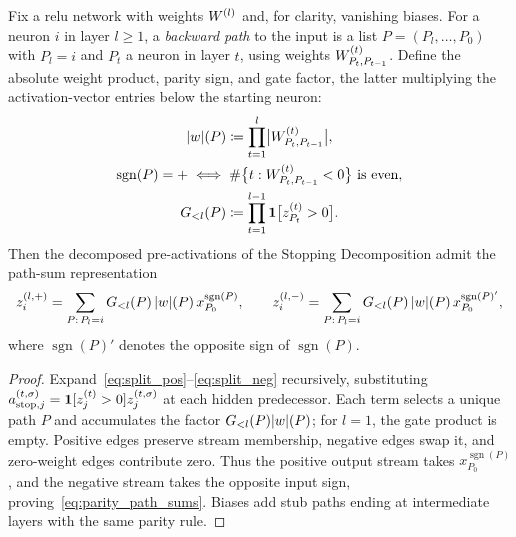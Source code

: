 \begin{lemmaenv}\label{lem:parity_path}
Fix a \ac{relu} network with weights $W^{(l)}$ and, for clarity, vanishing biases. For a neuron $i$ in layer $l \ge 1$, a \emph{backward path} to the input is a list $P = (P_l, \dots, P_0)$ with $P_l = i$ and $P_t$ a neuron in layer $t$, using weights $W^{(t)}_{P_t, P_{t-1}}$. Define the absolute weight product, parity sign, and gate factor, the latter multiplying the activation-vector entries below the starting neuron:
\begin{equation*}
\begin{gathered}
	\lvert w\rvert(P) \coloneqq \prod_{t=1}^{l} \bigl|W^{(t)}_{P_t, P_{t-1}}\bigr|,
\\
\operatorname{sgn}(P) = + \iff \#\bigl\{ t : W^{(t)}_{P_t, P_{t-1}} < 0 \bigr\}
    \text{ is even},
\\
	G_{<l}(P) \coloneqq \prod_{t=1}^{l-1} \mathbf{1}\bigl[z^{(t)}_{P_t} > 0\bigr].
\end{gathered}
\end{equation*}
Then the decomposed pre-activations of the Stopping Decomposition admit the path-sum representation
\begin{equation}
	z^{(l,+)}_i = \sum_{P :\, P_l = i} G_{<l}(P)\, \lvert w\rvert(P)\, x_{P_0}^{\operatorname{sgn}(P)},
	\qquad
	z^{(l,-)}_i = \sum_{P :\, P_l = i} G_{<l}(P)\, \lvert w\rvert(P)\, x_{P_0}^{\operatorname{sgn}(P)'},
	\label{eq:parity_path_sums}
\end{equation}
where $\operatorname{sgn}(P)' $ denotes the opposite sign of $\operatorname{sgn}(P)$.\end{lemmaenv}

\begin{proof}
Expand~\eqref{eq:split_pos}--\eqref{eq:split_neg} recursively, substituting $a_{\mathrm{stop},j}^{(t,\sigma)}=\mathbf{1}[z^{(t)}_j>0]z^{(t,\sigma)}_j$ at each hidden predecessor. Each term selects a unique path $P$ and accumulates the factor $G_{<l}(P)\lvert w\rvert(P)$; for $l=1$, the gate product is empty. Positive edges preserve stream membership, negative edges swap it, and zero-weight edges contribute zero. Thus the positive output stream takes $x_{P_0}^{\operatorname{sgn}(P)}$, and the negative stream takes the opposite input sign, proving~\eqref{eq:parity_path_sums}. Biases add stub paths ending at intermediate layers with the same parity rule.
\end{proof}

